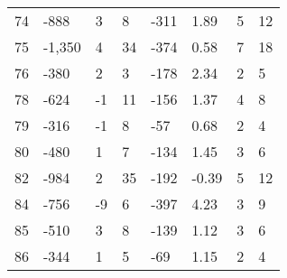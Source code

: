 \begin{appendices}
\begin{longtable}[c]{@{}llllllll@{}}
	74                       & -888                          & 3                            & 8                            & -311                     & 1.89                    & 5                    & 12                      \\
	75                       & -1,350                        & 4                            & 34                           & -374                     & 0.58                    & 7                    & 18                      \\
	76                       & -380                          & 2                            & 3                            & -178                     & 2.34                    & 2                    & 5                       \\
	78                       & -624                          & -1                           & 11                           & -156                     & 1.37                    & 4                    & 8                       \\
	79                       & -316                          & -1                           & 8                            & -57                      & 0.68                    & 2                    & 4                       \\
	80                       & -480                          & 1                            & 7                            & -134                     & 1.45                    & 3                    & 6                       \\
	82                       & -984                          & 2                            & 35                           & -192                     & -0.39                   & 5                    & 12                      \\
	84                       & -756                          & -9                           & 6                            & -397                     & 4.23                    & 3                    & 9                       \\
	85                       & -510                          & 3                            & 8                            & -139                     & 1.12                    & 3                    & 6                       \\
	86                       & -344                          & 1                            & 5                            & -69                      & 1.15                    & 2                    & 4                       \\

\end{longtable}
\end{appendices}

